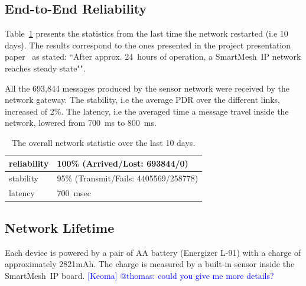 \documentclass{sig-alternate}
\newcommand{\keoma}[1]       {\textcolor{blue}{[Keoma] #1}}
\newcommand{\smip}           {SmartMesh~IP\xspace}
\begin{document}
\subsection{End-to-End Reliability}
\label{sec:net_reliability}


Table~\ref{tab:net_stats} presents the statistics from the last time the network restarted (i.e 10 days).
The results correspond to the ones presented in the project presentation paper~\cite{watteyne16peach} as stated:
``After approx. 24~hours of operation, a \smip network reaches steady state"".

All the 693,844 messages produced by the sensor network were received by the network gateway.
The stability, i.e the average PDR over the different links, increased of 2\%.
The latency, i.e the averaged time a message travel inside the network, lowered from 700~ms to 800~ms.

\begin{table}
    \begin{tabular}{|l|l|}
        \hline
        reliability & 100\% (Arrived/Lost:   693844/0)\\ \hline
        stability   & 95\% (Transmit/Fails: 4405569/258778)\\ \hline
        latency     & 700~msec\\
        \hline
    \end{tabular}
    \caption{The overall network statistic over the last 10 days.}
    \label{tab:net_stats}
\end{table}

\subsection{Network Lifetime}
\label{sec:charge}


Each device is powered by a pair of AA battery (Energizer L-91) with a charge of approximately 2821mAh.
The charge is measured by a built-in sensor inside the \smip board. \keoma{@thomas: could you give me more details?}

\end{document}
